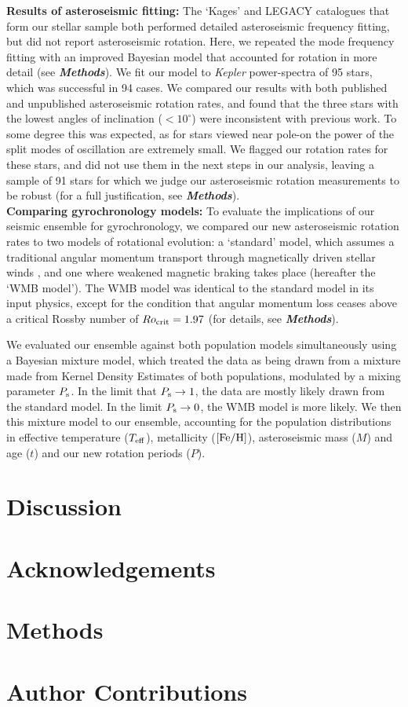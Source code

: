 \documentclass[12pt]{article}
\newcommand{\feh}{\mbox{$\rm{[Fe/H]}$}\xspace}
\newcommand{\kepler}{\emph{Kepler}\xspace}
\begin{document}
\textbf{Results of asteroseismic fitting:} The `Kages' and LEGACY catalogues that form our stellar sample both performed detailed asteroseismic frequency fitting, but did not report asteroseismic rotation. Here, we repeated the mode frequency fitting with an improved Bayesian model that accounted for rotation in more detail (see \textbf{\textit{Methods}}). We fit our model to \kepler power-spectra of 95 stars, which was successful in 94 cases. We compared our results with both published and unpublished asteroseismic rotation rates, and found that the three stars with the lowest angles of inclination ($< 10^\circ$) were inconsistent with previous work. To some degree this was expected, as  for stars viewed near pole-on the power of the split modes of oscillation are extremely small. We flagged our rotation rates for these stars, and did not use them in the next steps in our analysis, leaving a sample of 91 stars for which we judge our asteroseismic rotation measurements to be robust (for a full justification, see \textit{\textbf{Methods}}).\\

\textbf{Comparing gyrochronology models:} To evaluate the implications of our seismic ensemble for gyrochronology, we compared our new asteroseismic rotation rates to two models of rotational evolution: a `standard' model, which assumes a traditional angular momentum transport through magnetically driven stellar winds \cite{skumanich1972, kawaler1988}, and one where weakened magnetic braking takes place (hereafter the `WMB model'). The WMB model was identical to the standard model in its input physics, except for the condition that angular momentum loss ceases above a critical Rossby number of $Ro_{\rm crit} = 1.97$ (for details, see \textbf{\textit{Methods}}).

We evaluated our ensemble against both population models simultaneously using a Bayesian mixture model, which treated the data as being drawn from a mixture made from Kernel Density Estimates of both populations, modulated by a mixing parameter $P_{\rm s}$. In the limit that $P_{\rm s} \rightarrow 1$, the data are mostly likely drawn from the standard model. In the limit $P_{\rm s} \rightarrow 0$, the WMB model is more likely. We then this mixture model to our ensemble, accounting for the population distributions in effective temperature ($T_{\rm eff}$), metallicity (\feh), asteroseismic mass ($M$) and age ($t$) and our new rotation periods ($P$).

 

\section{Discussion}



\section*{Acknowledgements}

\section*{Methods}

\section*{Author Contributions}
\end{document}
